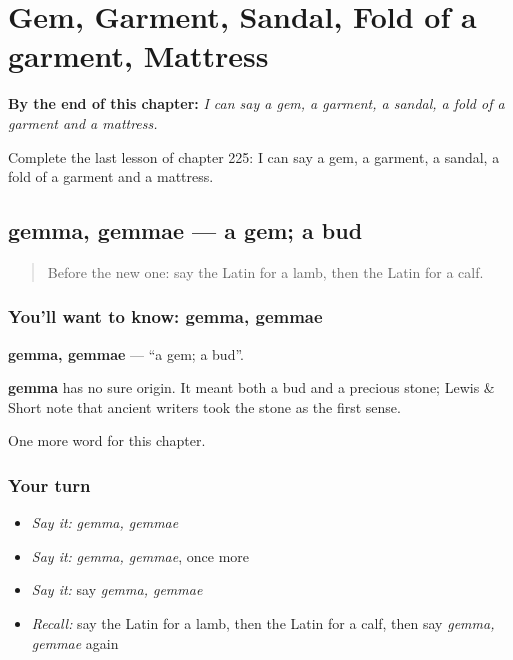 
\chapter{Gem, Garment, Sandal, Fold of a garment, Mattress}
\label{ch:la-gem-garment-sandal-fold-of-a-garment-mattress}

\begin{chapteropening}
\textbf{By the end of this chapter:} \emph{I can say a gem, a garment, a sandal, a fold of a garment and a mattress.}

Complete the last lesson of chapter 225: I can say a gem, a garment, a sandal, a fold of a garment and a mattress.
\end{chapteropening}

\section[gemma, gemmae]{gemma, gemmae — a gem; a bud}

\label{lesson:LA-C225-gemma}



\begin{quote}
Before the new one: say the Latin for a lamb, then the Latin for a calf.
\end{quote}

\subsection*{You'll want to know: gemma, gemmae}
\textbf{gemma, gemmae} — \textquotedblleft{}a gem; a bud\textquotedblright{}.

\begin{cousinweb}
\textbf{gemma} has no sure origin. It meant both a bud and a precious stone; Lewis \& Short note that ancient writers took the stone as the first sense.
\end{cousinweb}

\begin{grammarlens}[title={What you've built}]
One more word for this chapter.
\end{grammarlens}

\subsection*{Your turn}
\begin{itemize}
\raggedright
  \item \emph{Say it:} \emph{gemma, gemmae}
  \item \emph{Say it:} \emph{gemma, gemmae}, once more
  \item \emph{Say it:} say \emph{gemma, gemmae}
  \item \emph{Recall:} say the Latin for a lamb, then the Latin for a calf, then say \emph{gemma, gemmae} again
\end{itemize}


